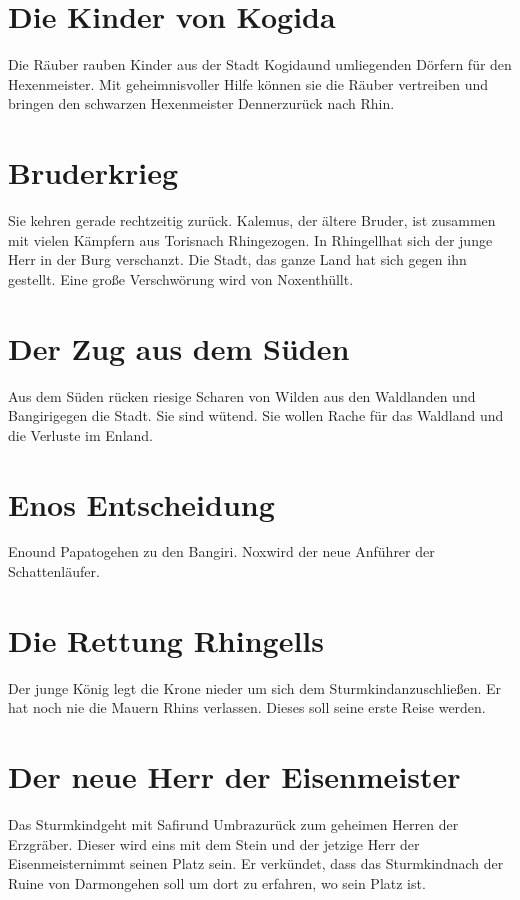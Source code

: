 \documentclass[12pt,a4paper,onecolumn,twoside,ngerman]{book}
\newcommand{\Sturmkind}{Sturmkind}
\newcommand{\Bangiri}{Bangiri}
\newcommand{\Papato}{Papato}
\newcommand{\Enland}{Enland}
\newcommand{\Eno}{Eno}
\newcommand{\Nox}{Nox}
\newcommand{\Umbra}{Umbra}
\newcommand{\Rhingell}{Rhingell}
\newcommand{\Rhin}{Rhin}
\newcommand{\Kalemus}{Kalemus}
\newcommand{\Kogida}{Kogida}
\newcommand{\Denner}{Denner}
\newcommand{\Toris}{Toris}
\newcommand{\Darmon}{Darmon}
\newcommand{\Eisenmeister}{Eisenmeister}
\newcommand{\Safir}{Safir}
\begin{document}
\section{Die Kinder von Kogida}
Die Räuber rauben Kinder aus der Stadt \Kogida und umliegenden Dörfern für den Hexenmeister. Mit geheimnisvoller Hilfe können sie die Räuber vertreiben und bringen den schwarzen Hexenmeister \Denner zurück nach \Rhin.

\section{Bruderkrieg}
Sie kehren gerade rechtzeitig zurück. \Kalemus , der ältere Bruder, ist zusammen mit vielen Kämpfern aus \Toris nach \Rhin gezogen. 
In \Rhingell hat sich der junge Herr in der Burg verschanzt. Die Stadt, das ganze Land hat sich gegen ihn gestellt. 
Eine große Verschwörung wird von \Nox enthüllt.

\section{Der Zug aus dem Süden}
Aus dem Süden rücken riesige Scharen von Wilden aus den Waldlanden und \Bangiri gegen die Stadt. Sie sind wütend. Sie wollen Rache für das Waldland und die Verluste im \Enland .

\section{{\Eno}s Entscheidung}
\Eno und \Papato gehen zu den \Bangiri . \Nox wird der neue Anführer der Schattenläufer.

\section{Die Rettung \Rhingell{s}}
Der junge König legt die Krone nieder um sich dem \Sturmkind anzuschließen. Er hat noch nie die Mauern \Rhin{s} verlassen. Dieses soll seine erste Reise werden.

\section{Der neue Herr der \Eisenmeister}
Das \Sturmkind geht mit \Safir und \Umbra zurück zum geheimen Herren der Erzgräber. Dieser wird eins mit dem Stein und der jetzige Herr der \Eisenmeister nimmt seinen Platz sein. Er verkündet, dass das \Sturmkind nach der Ruine von \Darmon gehen soll um dort zu erfahren, wo sein Platz ist.
\end{document}
